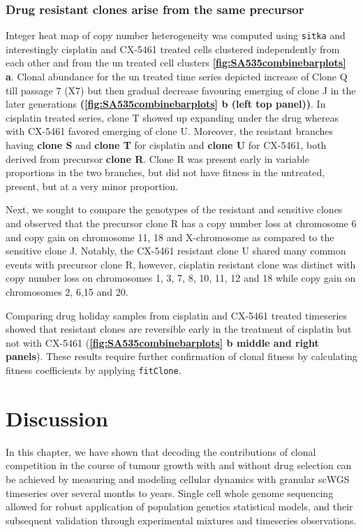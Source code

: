 \subsubsection{Drug resistant clones arise from the same precursor}
Integer heat map of copy number heterogeneity was computed using \texttt{sitka} and interestingly cisplatin and CX-5461 treated cells clustered independently from each other and from the un treated cell clusters \textbf{\autoref{fig:SA535combinebarplots} a}. Clonal abundance for the un treated time series depicted increase of Clone Q till passage 7 (X7) but then gradual decrease favouring emerging of clone J in the later generations \textbf{(\autoref{fig:SA535combinebarplots} b (left top panel))}. In cisplatin treated series, clone T showed up expanding under the drug whereas with CX-5461 favored emerging of clone U.
Moreover, the resistant branches having \textbf{clone S} and \textbf{clone T} for cisplatin and \textbf{clone U} for CX-5461, both derived from precursor \textbf{clone R}. Clone R was present early in variable proportions in the two branches, but did not have fitness in the untreated, present, but at a very minor proportion. 

Next, we sought to compare the genotypes of the resistant and sensitive clones and observed that the precursor clone R has a copy number loss at chromosome 6 and copy gain on chromosome 11, 18 and X-chromosome as compared to the sensitive clone J. Notably, the CX-5461 resistant clone U shared many common events with precursor clone R, however, cisplatin resistant clone was distinct with copy number loss on chromosomes 1, 3, 7, 8, 10, 11, 12 and 18 while copy gain on chromosomes 2, 6,15 and 20.


Comparing drug holiday samples from cisplatin and CX-5461 treated timeseries showed that resistant clones are reversible early in the treatment of cisplatin but not with CX-5461 (\textbf{\autoref{fig:SA535combinebarplots} b middle and right panels}).
These results require further confirmation of clonal fitness by calculating fitness coefficients by applying \texttt{fitClone}. 





\section{Discussion}

In this chapter, we have shown that decoding the contributions of clonal competition in the course of tumour growth with and without drug selection can be achieved by measuring and modeling cellular dynamics with granular scWGS timeseries over several months to years.
Single cell whole genome sequencing allowed for robust application of population genetics statistical models, and their subsequent validation through experimental mixtures and timeseries observations.

